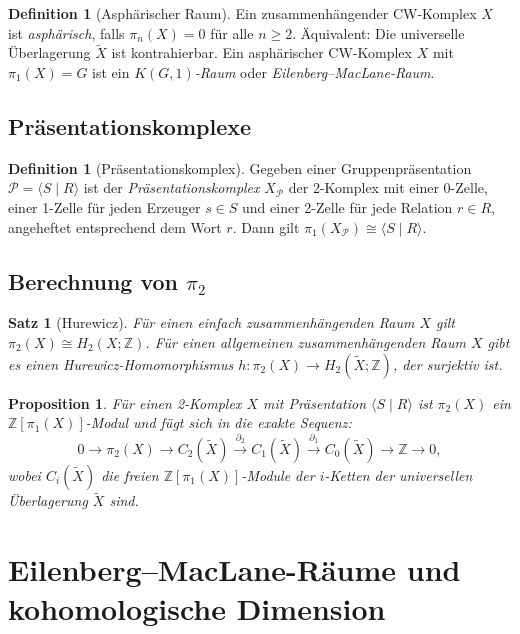 \documentclass[12pt,a4paper]{amsart}
\newtheorem{proposition}[theorem]{Proposition}
\newtheorem{satz}[theorem]{Satz}
\theoremstyle{definition}
\newtheorem{definition_de}[theorem]{Definition}
\theoremstyle{remark}
\newcommand{\Z}{\mathbb{Z}}
\begin{document}
\begin{definition_de}[Asphärischer Raum]
Ein zusammenhängender CW-Komplex $X$ ist \emph{asphärisch}, falls
$\pi_n(X) = 0$ für alle $n \geq 2$.
Äquivalent: Die universelle Überlagerung $\widetilde{X}$ ist kontrahierbar.
Ein asphärischer CW-Komplex $X$ mit $\pi_1(X) = G$ ist ein
\emph{$K(G,1)$-Raum} oder \emph{Eilenberg--MacLane-Raum}.
\end{definition_de}

\subsection{Präsentationskomplexe}

\begin{definition_de}[Präsentationskomplex]
Gegeben einer Gruppenpräsentation $\mathcal{P} = \langle S \mid R \rangle$
ist der \emph{Präsentationskomplex} $X_{\mathcal{P}}$ der 2-Komplex mit
einer 0-Zelle, einer 1-Zelle für jeden Erzeuger $s \in S$ und einer
2-Zelle für jede Relation $r \in R$, angeheftet entsprechend dem Wort $r$.
Dann gilt $\pi_1(X_{\mathcal{P}}) \cong \langle S \mid R \rangle$.
\end{definition_de}

\subsection{Berechnung von $\pi_2$}

\begin{satz}[Hurewicz]
Für einen einfach zusammenhängenden Raum $X$ gilt $\pi_2(X) \cong H_2(X; \Z)$.
Für einen allgemeinen zusammenhängenden Raum $X$ gibt es einen Hurewicz-Homomorphismus
$h \colon \pi_2(X) \to H_2(\widetilde{X}; \Z)$, der surjektiv ist.
\end{satz}

\begin{proposition}
Für einen 2-Komplex $X$ mit Präsentation $\langle S \mid R \rangle$
ist $\pi_2(X)$ ein $\Z[\pi_1(X)]$-Modul und fügt sich in die exakte Sequenz:
\[
    0 \to \pi_2(X) \to C_2(\widetilde{X}) \xrightarrow{\partial_2}
    C_1(\widetilde{X}) \xrightarrow{\partial_1}
    C_0(\widetilde{X}) \to \Z \to 0,
\]
wobei $C_i(\widetilde{X})$ die freien $\Z[\pi_1(X)]$-Module der
$i$-Ketten der universellen Überlagerung $\widetilde{X}$ sind.
\end{proposition}

\section{Eilenberg--MacLane-Räume und kohomologische Dimension}
\end{document}

